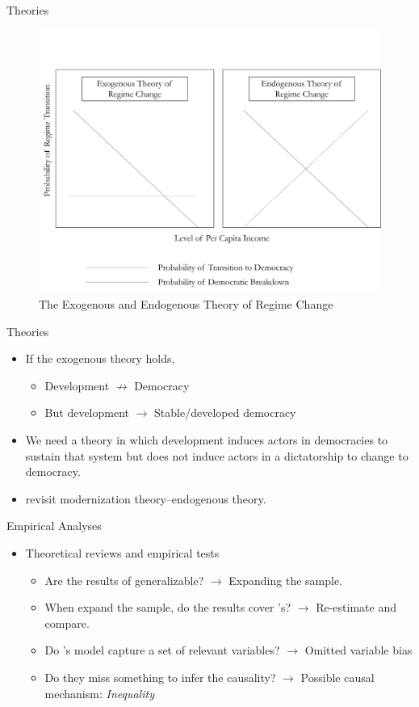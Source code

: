 \documentclass[xcolor=dvipsnames]{beamer}
\begin{document}
	\begin{frame}[fragile]{Theories}
	\begin{figure}
	\centering
	\includegraphics[width=0.6\linewidth]{theoretical.png}
	\caption{The Exogenous and Endogenous Theory of Regime Change}
	\end{figure}
	\end{frame}
	
	\begin{frame}[fragile]{Theories}
	\begin{itemize}
	  \item If the exogenous theory holds, 
	   \begin{itemize}
	    \item Development $\nrightarrow$ Democracy
	    \item But development $\rightarrow$ Stable/developed democracy
	   \end{itemize}
	  \item We need a theory in which development induces actors in democracies to sustain that system but does not induce actors in a dictatorship to change to democracy.
	   \item \citet{boix:stokes:2003} revisit modernization theory--endogenous theory.
	\end{itemize}
	\end{frame}
	
	
	\begin{frame}[fragile]{Empirical Analyses}
	\begin{itemize}
	  \item Theoretical reviews and empirical tests
	  \begin{itemize}
	  \item Are the results of \citet{przeworskietal:2000} generalizable? \pause $\rightarrow$ Expanding the sample.\pause
	  \item When \citet{boix:stokes:2003} expand the sample, do the results cover \citet{przeworskietal:2000}'s? \pause $\rightarrow$ Re-estimate and compare.\pause
	  \item Do \citet{przeworskietal:2000}'s model capture a set of relevant variables? \pause $\rightarrow$ Omitted variable bias \pause
	  \item Do they miss something to infer the causality? \pause $\rightarrow$ Possible causal mechanism: \textit{Inequality}
	  \end{itemize}
	 \end{itemize}
\end{frame}
\end{document}
